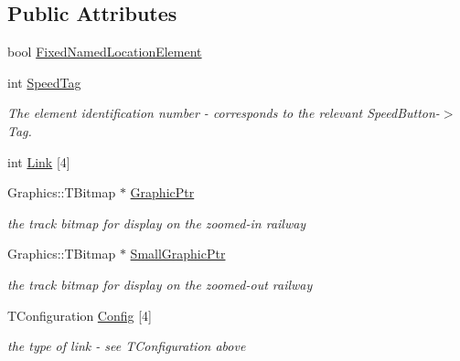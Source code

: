 \subsection*{Public Attributes}
\begin{DoxyCompactItemize}
\item 
bool \mbox{\hyperlink{class_t_fixed_track_piece_a2d225bf10a7fb1c7e8ffd924b4d4ed2a}{Fixed\+Named\+Location\+Element}}
\item 
\mbox{\label{class_t_fixed_track_piece_ad4f1d13f7b7c0dc13ad378706aa55238}} 
int \mbox{\hyperlink{class_t_fixed_track_piece_ad4f1d13f7b7c0dc13ad378706aa55238}{Speed\+Tag}}
\begin{DoxyCompactList}\small\item\em The element identification number -\/ corresponds to the relevant Speed\+Button-\/$>$Tag. \end{DoxyCompactList}\item 
int \mbox{\hyperlink{class_t_fixed_track_piece_a6f604279e2311669576eb9bf36d8cfee}{Link}} \mbox{[}4\mbox{]}
\item 
\mbox{\label{class_t_fixed_track_piece_a2a8cecb1cf81e95b1ee665dedc4c2465}} 
Graphics\+::\+T\+Bitmap $\ast$ \mbox{\hyperlink{class_t_fixed_track_piece_a2a8cecb1cf81e95b1ee665dedc4c2465}{Graphic\+Ptr}}
\begin{DoxyCompactList}\small\item\em the track bitmap for display on the zoomed-\/in railway \end{DoxyCompactList}\item 
\mbox{\label{class_t_fixed_track_piece_a17923e22e532556ac072acaec3931621}} 
Graphics\+::\+T\+Bitmap $\ast$ \mbox{\hyperlink{class_t_fixed_track_piece_a17923e22e532556ac072acaec3931621}{Small\+Graphic\+Ptr}}
\begin{DoxyCompactList}\small\item\em the track bitmap for display on the zoomed-\/out railway \end{DoxyCompactList}\item 
\mbox{\label{class_t_fixed_track_piece_ab0230b6fb2112bce31f205ae7ed5fd07}} 
T\+Configuration \mbox{\hyperlink{class_t_fixed_track_piece_ab0230b6fb2112bce31f205ae7ed5fd07}{Config}} \mbox{[}4\mbox{]}
\begin{DoxyCompactList}\small\item\em the type of link -\/ see T\+Configuration above \end{DoxyCompactList}\item 

\end{DoxyCompactItemize}
